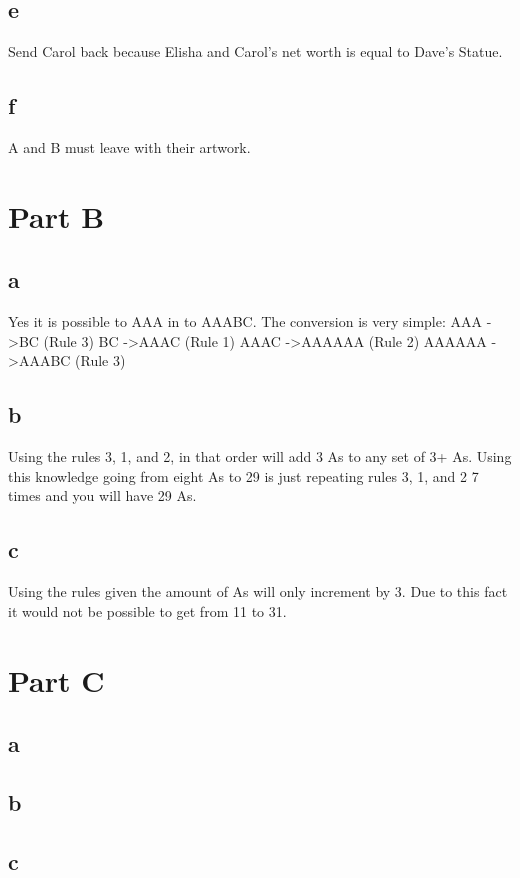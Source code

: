 \documentclass[12pt]{amsart}
\begin{document}
\subsection*{e}
Send Carol back because Elisha and Carol's net worth is equal to Dave's Statue. 

\subsection*{f}
A and B must leave with their artwork.

\newpage

\section*{Part B}
\subsection*{a}
Yes it is possible to AAA in to AAABC. The conversion is very simple:
\newline
AAA \quad -\textgreater \quad BC (Rule 3) %
\newline
BC \quad -\textgreater \quad AAAC (Rule 1) %
\newline
AAAC \quad -\textgreater \quad AAAAAA (Rule 2) %
\newline
AAAAAA \quad -\textgreater \quad AAABC (Rule 3) %


\subsection*{b}
Using the rules 3, 1, and 2, in that order will add 3 As to any set of 3+ As. Using this knowledge going from eight As to 29 is just repeating rules 3, 1, and 2 7 times and you will have 29 As.

\subsection*{c}
Using the rules given the amount of As will only increment by 3. Due to this fact it would not be possible to get from 11 to 31.

\newpage

\section*{Part C}
\subsection*{a}


\subsection*{b}

\subsection*{c}
\end{document}
